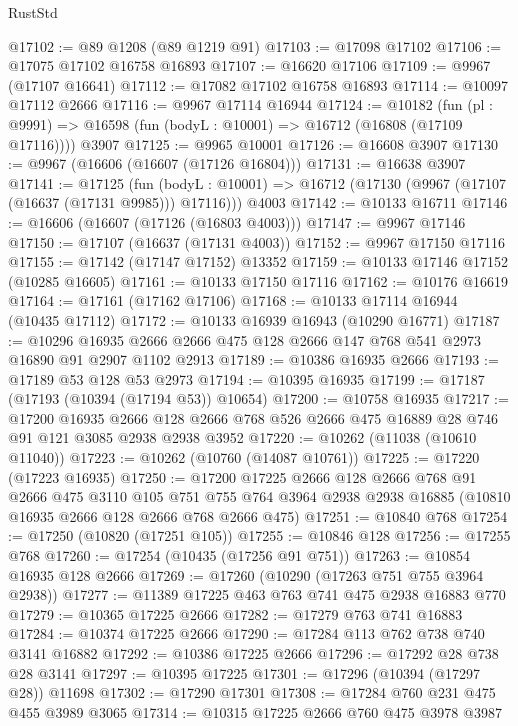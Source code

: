 \begin{lexlean}{RustStd}
\begin{coremodule}
{\begin{coremodule}
{{{{{{{{{{{{{{{{{{{{{{{{{{{{{{{{{{{{{{{{{{{{{{{{{{{{{{{{{{{{{{{{{{{{{{{{{{{{{{@17102 := @89 @1208 (@89 @1219 @91)
@17103 := @17098 @17102
@17106 := @17075 @17102 @16758 @16893
@17107 := @16620 @17106
@17109 := @9967 (@17107 @16641)
@17112 := @17082 @17102 @16758 @16893
@17114 := @10097 @17112 @2666
@17116 := @9967 @17114 @16944
@17124 := @10182
    (fun (pl : @9991) => @16598 (fun (bodyL : @10001) => @16712 (@16808 (@17109 @17116))))
    @3907
@17125 := @9965 @10001
@17126 := @16608 @3907
@17130 := @9967 (@16606 (@16607 (@17126 @16804)))
@17131 := @16638 @3907
@17141 := @17125
    (fun (bodyL : @10001) => @16712 (@17130 (@9967 (@17107 (@16637 (@17131 @9985))) @17116)))
    @4003
@17142 := @10133 @16711
@17146 := @16606 (@16607 (@17126 (@16803 @4003)))
@17147 := @9967 @17146
@17150 := @17107 (@16637 (@17131 @4003))
@17152 := @9967 @17150 @17116
@17155 := @17142 (@17147 @17152) @13352
@17159 := @10133 @17146 @17152 (@10285 @16605)
@17161 := @10133 @17150 @17116
@17162 := @10176 @16619
@17164 := @17161 (@17162 @17106)
@17168 := @10133 @17114 @16944 (@10435 @17112)
@17172 := @10133 @16939 @16943 (@10290 @16771)
@17187 := @10296
    @16935
    @2666
    @2666
    @475
    @128
    @2666
    @147
    @768
    @541
    @2973
    @16890
    @91
    @2907
    @1102
    @2913
@17189 := @10386 @16935 @2666
@17193 := @17189 @53 @128 @53 @2973
@17194 := @10395 @16935
@17199 := @17187 (@17193 (@10394 (@17194 @53)) @10654)
@17200 := @10758 @16935
@17217 := @17200
    @16935
    @2666
    @128
    @2666
    @768
    @526
    @2666
    @475
    @16889
    @28
    @746
    @91
    @121
    @3085
    @2938
    @2938
    @3952
@17220 := @10262 (@11038 (@10610 @11040))
@17223 := @10262 (@10760 (@14087 @10761))
@17225 := @17220 (@17223 @16935)
@17250 := @17200
    @17225
    @2666
    @128
    @2666
    @768
    @91
    @2666
    @475
    @3110
    @105
    @751
    @755
    @764
    @3964
    @2938
    @2938
    @16885
    (@10810 @16935 @2666 @128 @2666 @768 @2666 @475)
@17251 := @10840 @768
@17254 := @17250 (@10820 (@17251 @105))
@17255 := @10846 @128
@17256 := @17255 @768
@17260 := @17254 (@10435 (@17256 @91 @751))
@17263 := @10854 @16935 @128 @2666
@17269 := @17260 (@10290 (@17263 @751 @755 @3964 @2938))
@17277 := @11389 @17225 @463 @763 @741 @475 @2938 @16883 @770
@17279 := @10365 @17225 @2666
@17282 := @17279 @763 @741 @16883
@17284 := @10374 @17225 @2666
@17290 := @17284 @113 @762 @738 @740 @3141 @16882
@17292 := @10386 @17225 @2666
@17296 := @17292 @28 @738 @28 @3141
@17297 := @10395 @17225
@17301 := @17296 (@10394 (@17297 @28)) @11698
@17302 := @17290 @17301
@17308 := @17284 @760 @231 @475 @455 @3989 @3065
@17314 := @10315 @17225 @2666 @760 @475 @3978 @3987
}}}}}}}}}}}}}}}}}}}}}}}}}}}}}}}}}}}}}}}}}}}}}}}}}}}}}}}}}}}}}}}}}}}}}}}}}}}}}}
\end{coremodule}}
\end{coremodule}
\end{lexlean}
